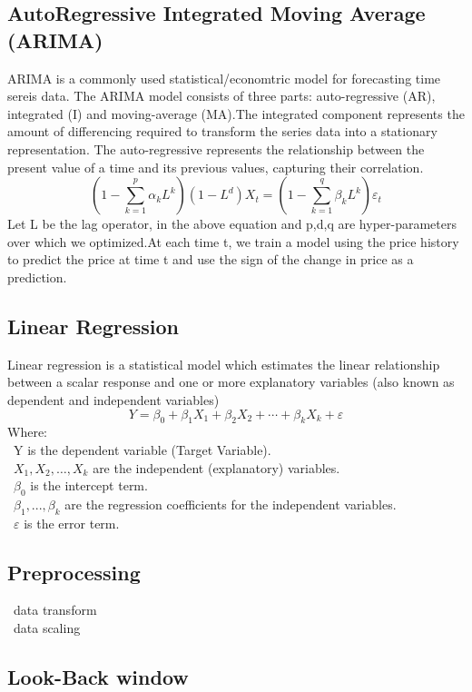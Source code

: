 \documentclass{ieeeojies}
\begin{document}
\subsection{AutoRegressive Integrated
Moving Average (ARIMA)} 
ARIMA is a commonly used statistical/economtric model for forecasting time sereis data. The ARIMA model consists of three parts: auto-regressive (AR), integrated (I) and moving-average (MA).The integrated component represents
the amount of differencing required to transform the series data
into a stationary representation. The auto-regressive represents the relationship between the present value of a time and its previous values, capturing their correlation. 
\begin{equation*}
(1 - \sum_{k=1}^{p} \alpha_k L^k)(1 - L^d)X_t = (1 - \sum_{k=1}^{q} \beta_k L^k) \varepsilon_t
\end{equation*}
Let L be the lag operator, in the above equation and p,d,q are hyper-parameters over which we optimized.At each time t, we train a model using the price history to predict the price at time t and use the sign of the change in price as a prediction.
\subsection{Linear Regression}
 Linear regression is a statistical model which estimates the linear relationship between a scalar response and one or more explanatory variables (also known as dependent and independent variables)
 \[Y=\beta_0+\beta_1X_1+\beta_2X_2+\cdots+\beta_kX_k+\varepsilon\]
Where:\\
	\indent\textbullet\ Y is the dependent variable (Target Variable).\\
	\indent\textbullet\ \(X_1, X_2, \ldots, X_k\) are the independent (explanatory) variables.\\
	\indent\textbullet\ \(\beta_0\) is the intercept term.\\
	\indent\textbullet\ \(\beta_1,..., \beta_k\) are the regression coefficients for the independent variables.\\
	\indent\textbullet\ \(\varepsilon\) is the error term.
 \subsection{Preprocessing}
 \textbullet\ data transform \\
 \textbullet\ data scaling
 \subsection{Look-Back window}
\end{document}
